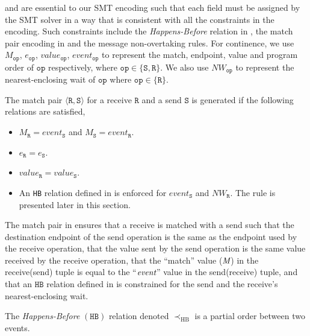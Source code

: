  and  are essential to our SMT encoding such that each field must be assigned by the SMT solver in a way that is consistent with all the constraints in the encoding. Such constraints include the \emph{Happens-Before} relation in , the match pair encoding in  and the message non-overtaking rules. For continence, we use $M_{\mathtt{op}}$, $e_{\mathtt{op}}$, $value_{\mathtt{op}}$, $event_{\mathtt{op}}$ to represent the match, endpoint, value and program order of $\mathtt{op}$ respectively, where $\mathtt{op} \in \{\mathtt{S}, \mathtt{R}\}$. We also use $NW_{\mathtt{op}}$ to represent the nearest-enclosing wait of $\mathtt{op}$ where $\mathtt{op} \in \{\mathtt{R}\}$. 

\begin{definition}
The match pair $\langle\mathtt{R}, \mathtt{S}\rangle$ for a receive $\mathtt{R}$ and a send $\mathtt{S}$ is generated if the following relations are satisfied,
\begin{itemize}
\item $M_{\mathtt{R}} = event_{\mathtt{S}}$ and $M_{\mathtt{S}} = event_{\mathtt{R}}$. 
\item $e_{\mathtt{R}} = e_{\mathtt{S}}$.
\item $value_{\mathtt{R}} = value_{\mathtt{S}}$.
\item An \texttt{HB} relation defined in  is enforced for $event_{\mathtt{S}}$ and $NW_{\mathtt{R}}$. The rule is presented later in this section.
\end{itemize}
\label{def:match}
\end{definition}

The match pair in  ensures that a receive is matched with a send such that the destination endpoint of the send operation is the same as the endpoint used by the receive operation, that the value sent by the send operation is the same value received by the receive operation, that the ``match'' value ($\emph{M}$) in the receive(send) tuple is equal to the ``$\emph{event}$'' value in the send(receive) tuple, and that an $\mathtt{HB}$ relation defined in  is constrained for the send and the receive's nearest-enclosing wait.

\begin{definition}
The \emph{Happens-Before} $(\mathtt{HB})$ relation denoted $\mathrm{\prec_{HB}}$ is a partial order between two events.
\label{def:hb}
\end{definition}


